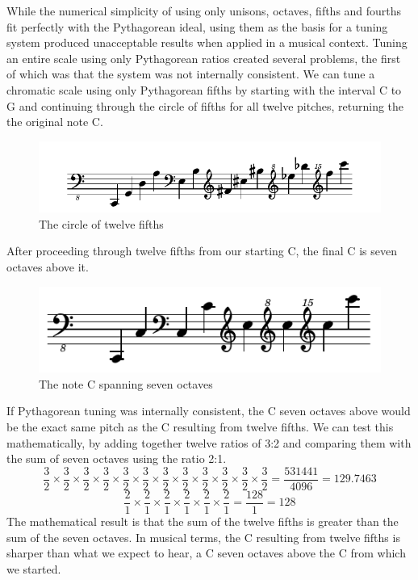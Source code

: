 While the numerical simplicity of using only unisons, octaves, fifths and
fourths fit perfectly with the Pythagorean ideal, using them as the basis for a
tuning system produced unacceptable results when applied in a musical context.
Tuning an entire scale using only Pythagorean ratios created several problems,
the first of which was that the system was not internally consistent.  We can tune a chromatic
scale using only Pythagorean fifths by starting with the interval C to G and continuing through
the circle of fifths for all twelve pitches, returning the the original note C.
\begin{figure}[h]
\centering
\includegraphics{examples/12-fifths.pdf}
\caption{The circle of twelve fifths}
\end{figure}
After proceeding through twelve fifths from our starting C, the final C is seven octaves above it.
\begin{figure}[h]
\centering
\includegraphics{examples/7-octaves.pdf}
\caption{The note C spanning seven octaves}
\end{figure}
If Pythagorean tuning was internally consistent, the C seven octaves above would be the
exact same pitch as the C resulting from twelve fifths.  We can test this mathematically,
by adding together twelve ratios of 3:2 and comparing them with the sum of seven octaves
using the ratio 2:1.\autocite[25]{RD:1}
\begin{equation}
    \frac{3}{2} \times
    \frac{3}{2} \times
    \frac{3}{2} \times
    \frac{3}{2} \times
    \frac{3}{2} \times
    \frac{3}{2} \times
    \frac{3}{2} \times
    \frac{3}{2} \times
    \frac{3}{2} \times
    \frac{3}{2} \times
    \frac{3}{2} \times
    \frac{3}{2} = \frac{531441}{4096} = 129.7463
\end{equation}
\begin{equation}
    \frac{2}{1} \times
    \frac{2}{1} \times
    \frac{2}{1} \times
    \frac{2}{1} \times
    \frac{2}{1} \times
    \frac{2}{1} = \frac{128}{1} = 128
\end{equation}
The mathematical result is that the sum of the twelve fifths is greater than the sum of the
seven octaves.  In musical terms, the C resulting from twelve fifths is sharper
than what we expect to hear, a C seven octaves above the C from which we started.

